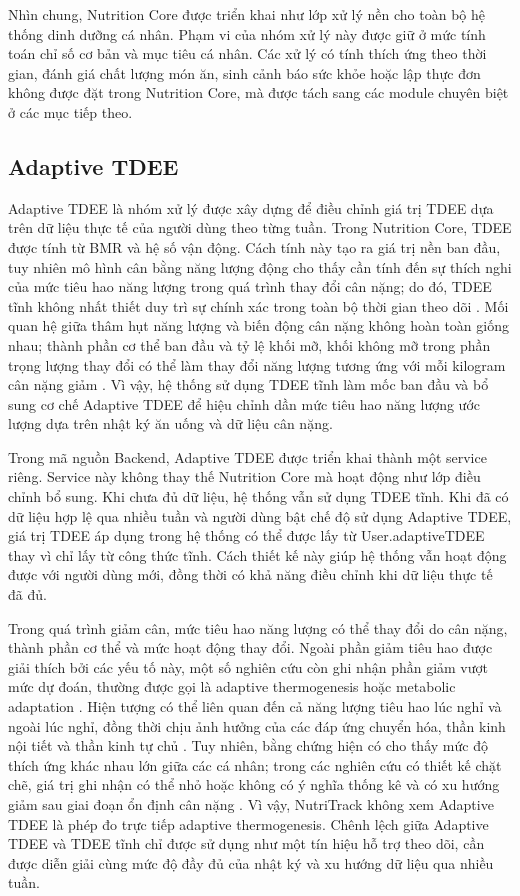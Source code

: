 \documentclass[12pt, a4paper]{report}
\begin{document}
Nhìn chung, Nutrition Core được triển khai như lớp xử lý nền cho toàn bộ hệ thống dinh dưỡng cá nhân. Phạm vi của nhóm xử lý này được giữ ở mức tính toán chỉ số cơ bản và mục tiêu cá nhân. Các xử lý có tính thích ứng theo thời gian, đánh giá chất lượng món ăn, sinh cảnh báo sức khỏe hoặc lập thực đơn không được đặt trong Nutrition Core, mà được tách sang các module chuyên biệt ở các mục tiếp theo.

\subsection{Adaptive TDEE}Adaptive TDEE là nhóm xử lý được xây dựng để điều chỉnh giá trị TDEE dựa trên dữ liệu thực tế của người dùng theo từng tuần. Trong Nutrition Core, TDEE được tính từ BMR và hệ số vận động. Cách tính này tạo ra giá trị nền ban đầu, tuy nhiên mô hình cân bằng năng lượng động cho thấy cần tính đến sự thích nghi của mức tiêu hao năng lượng trong quá trình thay đổi cân nặng; do đó, TDEE tĩnh không nhất thiết duy trì sự chính xác trong toàn bộ thời gian theo dõi \cite{hall2011_lancet}. Mối quan hệ giữa thâm hụt năng lượng và biến động cân nặng không hoàn toàn giống nhau; thành phần cơ thể ban đầu và tỷ lệ khối mỡ, khối không mỡ trong phần trọng lượng thay đổi có thể làm thay đổi năng lượng tương ứng với mỗi kilogram cân nặng giảm \cite{chow_hall_2008}. Vì vậy, hệ thống sử dụng TDEE tĩnh làm mốc ban đầu và bổ sung cơ chế Adaptive TDEE để hiệu chỉnh dần mức tiêu hao năng lượng ước lượng dựa trên nhật ký ăn uống và dữ liệu cân nặng.

Trong mã nguồn Backend, Adaptive TDEE được triển khai thành một service riêng. Service này không thay thế Nutrition Core mà hoạt động như lớp điều chỉnh bổ sung. Khi chưa đủ dữ liệu, hệ thống vẫn sử dụng TDEE tĩnh. Khi đã có dữ liệu hợp lệ qua nhiều tuần và người dùng bật chế độ sử dụng Adaptive TDEE, giá trị TDEE áp dụng trong hệ thống có thể được lấy từ User.adaptiveTDEE thay vì chỉ lấy từ công thức tĩnh. Cách thiết kế này giúp hệ thống vẫn hoạt động được với người dùng mới, đồng thời có khả năng điều chỉnh khi dữ liệu thực tế đã đủ.

Trong quá trình giảm cân, mức tiêu hao năng lượng có thể thay đổi do cân nặng, thành phần cơ thể và mức hoạt động thay đổi. Ngoài phần giảm tiêu hao được giải thích bởi các yếu tố này, một số nghiên cứu còn ghi nhận phần giảm vượt mức dự đoán, thường được gọi là adaptive thermogenesis hoặc metabolic adaptation \cite{muller2013, rosenbaum2010}. Hiện tượng có thể liên quan đến cả năng lượng tiêu hao lúc nghỉ và ngoài lúc nghỉ, đồng thời chịu ảnh hưởng của các đáp ứng chuyển hóa, thần kinh nội tiết và thần kinh tự chủ \cite{muller2013, rosenbaum2010}. Tuy nhiên, bằng chứng hiện có cho thấy mức độ thích ứng khác nhau lớn giữa các cá nhân; trong các nghiên cứu có thiết kế chặt chẽ, giá trị ghi nhận có thể nhỏ hoặc không có ý nghĩa thống kê và có xu hướng giảm sau giai đoạn ổn định cân nặng \cite{nunes2022}. Vì vậy, NutriTrack không xem Adaptive TDEE là phép đo trực tiếp adaptive thermogenesis. Chênh lệch giữa Adaptive TDEE và TDEE tĩnh chỉ được sử dụng như một tín hiệu hỗ trợ theo dõi, cần được diễn giải cùng mức độ đầy đủ của nhật ký và xu hướng dữ liệu qua nhiều tuần.
\end{document}
